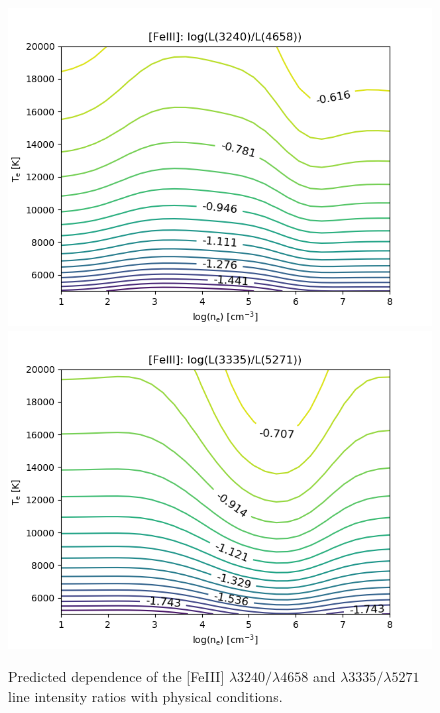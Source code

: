 \documentclass[twocolumn,linenumbers]{aastex63}
\begin{document}
\begin{figure}
\centering
\includegraphics[width=\columnwidth]{3240_4658.png}
\includegraphics[width=\columnwidth]{3335_5271.png}
\caption{Predicted dependence of the [Fe\thinspace III] $\lambda3240/\lambda4658$ and $\lambda3335/\lambda5271$
line intensity ratios with physical conditions.}
\label{fig:predicted_ratios_feiii}
\end{figure}
\end{document}
